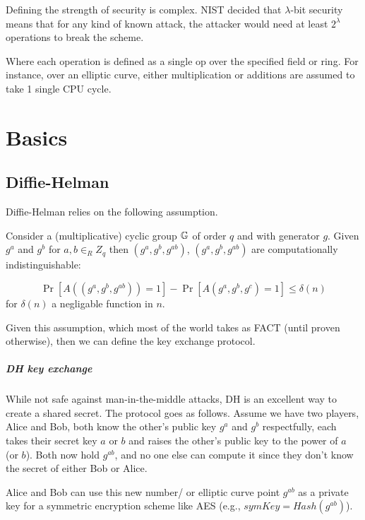 \begin{definition}
  Defining the strength of security is complex. NIST decided that $\lambda$-bit security 
  means that for any kind of known attack, the attacker would need at least $2^{\lambda}$
  operations to break the scheme.

  Where each operation is defined as a single op over the specified field or ring.
  For instance, over an elliptic curve, either multiplication or additions are assumed to 
  take 1 single CPU cycle.
  
\end{definition}

\chapter{Basics}
\section{Diffie-Helman}
Diffie-Helman relies on the following assumption.

\begin{definition} \label{DDH}
  Consider a (multiplicative) cyclic group $\mathbb{G}$ of order $q$ and with generator $g$. 
  Given $g^a$ and $g^b$ for $a,b\in_R Z_q$ then $(g^a,g^b,g^{ab})$, $(g^a,g^b,g^{ab})$ are computationally indistinguishable:

  $$ \Pr[A((g^a,g^b,g^{ab}))=1] - \Pr[A(g^a,g^b,g^{c})=1]\le \delta(n)$$
  for $\delta(n)$ a negligable function in $n$.
\end{definition}

Given this assumption, which most of the world takes as FACT (until proven otherwise), then
we can define the key exchange protocol.
\paragraph{DH key exchange}
While not safe against man-in-the-middle attacks, DH is an excellent way to create a shared secret.
The protocol goes as follows.
Assume we have two players, Alice and Bob, both know the other's public key $g^a$ and $g^b$ respectfully,
each takes their secret key $a$ or $b$ and raises the other's public key to the power of $a$ (or $b$).
Both now hold $g^{ab}$, and no one else can compute it since they don't know the secret of either Bob or Alice.

Alice and Bob can use this new number/ or elliptic curve point $g^{ab}$ as a private key for
a symmetric encryption scheme like AES (e.g., $symKey=Hash(g^{ab})$).



